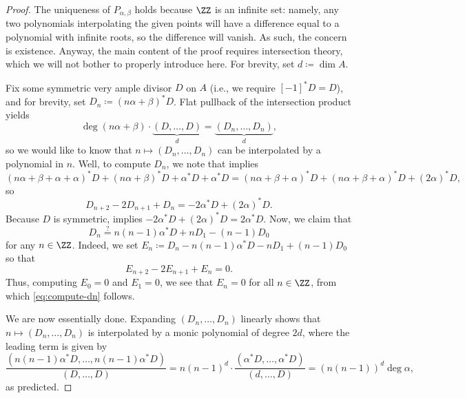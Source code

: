 \documentclass{amsart}
\begin{document}
\begin{proof}
	The uniqueness of $P_{\alpha,\beta}$ holds because $\ZZ$ is an infinite set: namely, any two polynomials interpolating the given points will have a difference equal to a polynomial with infinite roots, so the difference will vanish. As such, the concern is existence. Anyway, the main content of the proof requires intersection theory, which we will not bother to properly introduce here. For brevity, set $d\coloneqq\dim A$.
	
	Fix some symmetric very ample divisor $D$ on $A$ (i.e., we require $[-1]^*D=D$), and for brevity, set $D_n\coloneqq(n\alpha+\beta)^*D$. Flat pullback of the intersection product yields
	\[\deg(n\alpha+\beta)\cdot\underbrace{(D,\ldots,D)}_{d}=\underbrace{(D_n,\ldots,D_n)}_d,\]
	so we would like to know that $n\mapsto(D_n,\ldots,D_n)$ can be interpolated by a polynomial in $n$. Well, to compute $D_n$, we note that \cite[Corollary~2.13]{elber-av} implies
	\[(n\alpha+\beta+\alpha+\alpha)^*D+(n\alpha+\beta)^*D+\alpha^*D+\alpha^*D=(n\alpha+\beta+\alpha)^*D+(n\alpha+\beta+\alpha)^*D+(2\alpha)^*D,\]
	so
	\[D_{n+2}-2D_{n+1}+D_n=-2\alpha^*D+(2\alpha)^*D.\]
	Because $D$ is symmetric, \cite[Corollary~2.14]{elber-av} implies $-2\alpha^*D+(2\alpha)^*D=2\alpha^*D$. Now, we claim that
	\begin{equation}
		D_n\stackrel?=n(n-1)\alpha^*D+nD_1-(n-1)D_0 \label{eq:compute-dn}
	\end{equation}
	for any $n\in\ZZ$. Indeed, we set $E_n\coloneqq D_n-n(n-1)\alpha^*D-nD_1+(n-1)D_0$ so that
	\[E_{n+2}-2E_{n+1}+E_n=0.\]
	Thus, computing $E_0=0$ and $E_1=0$, we see that $E_n=0$ for all $n\in\ZZ$, from which \eqref{eq:compute-dn} follows.

	We are now essentially done. Expanding $(D_n,\ldots,D_n)$ linearly shows that $n\mapsto(D_n,\ldots,D_n)$ is interpolated by a monic polynomial of degree $2d$, where the leading term is given by
	\[\frac{(n(n-1)\alpha^*D,\ldots,n(n-1)\alpha^*D)}{(D,\ldots,D)}=n(n-1)^d\cdot\frac{(\alpha^*D,\ldots,\alpha^*D)}{(d,\ldots,D)}=(n(n-1))^d\deg\alpha,\]
	as predicted.
\end{proof}
\end{document}

